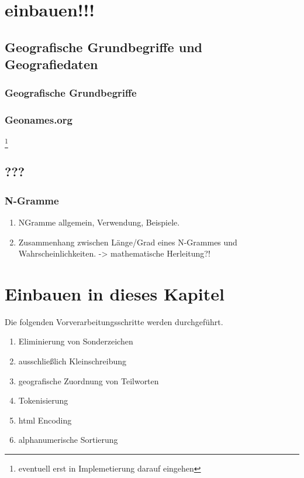 \section*{einbauen!!!}
\subsection{Geografische Grundbegriffe und Geografiedaten}

		\subsubsection{Geografische Grundbegriffe}

		\subsubsection{Geonames.org} \footnote{eventuell erst in Implemetierung darauf eingehen} 
			

		\subsubsection{}	

	\subsection{???} 
		\subsubsection{N-Gramme}
			\begin{enumerate}
				\item NGramme allgemein, Verwendung, Beispiele. 
				\item {} Zusammenhang zwischen Länge/Grad eines N-Grammes und Wahrscheinlichkeiten. -> mathematische Herleitung?!
			\end{enumerate}




\section{Einbauen in dieses Kapitel}

Die folgenden Vorverarbeitungsschritte werden durchgeführt.

	\begin{enumerate}
		\item Eliminierung von Sonderzeichen
		\item ausschließlich Kleinschreibung
		\item geografische Zuordnung von Teilworten  	
		\item Tokenisierung
		\item html Encoding
		\item alphanumerische Sortierung 
	\end{enumerate}

